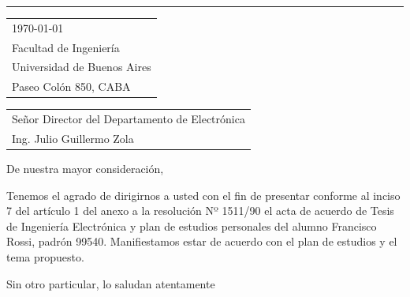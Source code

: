 \documentclass{article}
\begin{document}
\vspace{-1em} %

\rule{\linewidth}{1pt} %

\bigskip\bigskip %


\hfill
\begin{tabular}{l @{}}
	\today \bigskip\\ %
	Facultad de Ingeniería \\
	Universidad de Buenos Aires \\
	Paseo Colón 850, CABA
\end{tabular}

\bigskip %


\begin{tabular}{@{} l}
	Señor Director del Departamento de Electrónica \\
	Ing. Julio Guillermo Zola \\
\end{tabular}

\bigskip

De nuestra mayor consideración,

\bigskip


Tenemos el agrado de dirigirnos a usted con el fin de presentar conforme al inciso 7 del artículo 1 del anexo a la resolución Nº 1511/90 el acta de acuerdo de Tesis de Ingeniería Electrónica y plan de estudios personales del alumno Francisco Rossi, padrón 99540.
Manifiestamos estar de acuerdo con el plan de estudios y el tema propuesto.


\bigskip %

Sin otro particular, lo saludan atentamente

\vspace{100pt} %
\end{document}
